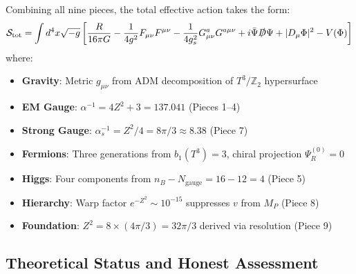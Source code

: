 \documentclass[12pt,a4paper]{article}
\newcommand{\Ztwo}{\mathbb{Z}_2}
\newcommand{\Tthree}{T^3}
\newcommand{\Zsq}{Z^2}
\begin{document}
Combining all nine pieces, the total effective action takes the form:
\begin{equation}
\mathcal{S}_{\text{tot}} = \int d^4x \sqrt{-g} \left[ \frac{R}{16\pi G} - \frac{1}{4g^2}F_{\mu\nu}F^{\mu\nu} - \frac{1}{4g_s^2}G^a_{\mu\nu}G^{a\mu\nu} + i\bar{\Psi}\slashed{D}\Psi + |D_\mu\Phi|^2 - V(\Phi) \right]
\end{equation}
where:
\begin{itemize}[itemsep=0pt]
    \item \textbf{Gravity}: Metric $g_{\mu\nu}$ from ADM decomposition of $\Tthree/\Ztwo$ hypersurface
    \item \textbf{EM Gauge}: $\alpha^{-1} = 4\Zsq + 3 = 137.041$ (Pieces 1--4)
    \item \textbf{Strong Gauge}: $\alpha_s^{-1} = \Zsq/4 = 8\pi/3 \approx 8.38$ (Piece 7)
    \item \textbf{Fermions}: Three generations from $b_1(T^3) = 3$, chiral projection $\Psi_R^{(0)} = 0$
    \item \textbf{Higgs}: Four components from $n_B - N_{\text{gauge}} = 16 - 12 = 4$ (Piece 5)
    \item \textbf{Hierarchy}: Warp factor $e^{-\Zsq} \sim 10^{-15}$ suppresses $v$ from $M_P$ (Piece 8)
    \item \textbf{Foundation}: $\Zsq = 8 \times (4\pi/3) = 32\pi/3$ derived via resolution (Piece 9)
\end{itemize}

\subsection{Theoretical Status and Honest Assessment}
\end{document}
